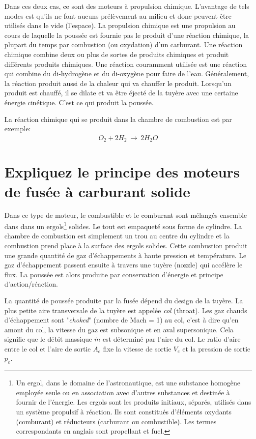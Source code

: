 \documentclass{report}
\begin{document}
Dans ces deux cas, ce sont des moteurs à propulsion chimique. L'avantage de tels modes est qu'ils ne font aucuns prélèvement au milieu et donc peuvent être utilisés dans le vide (l'espace). La propulsion chimique est une propulsion au cours de laquelle la poussée est fournie pas le produit d'une réaction chimique, la plupart du temps par combustion (ou oxydation) d'un carburant. Une réaction chimique combine deux ou plus de sortes de produits chimiques et produit différents produits chimiques. Une réaction couramment utilisée est une réaction qui combine du di-hydrogène et du di-oxygène pour faire de l'eau. Généralement, la réaction produit aussi de la chaleur qui va chauffer le produit. Lorsqu'un produit est chauffé, il se dilate et va être éjecté de la tuyère avec une certaine énergie cinétique. C'est ce qui produit la poussée.

La réaction chimique qui se produit dans la chambre de combustion est par exemple:
\begin{eqnarray}
O_2+2H_2~\rightarrow~2H_2O
\end{eqnarray}

\section{Expliquez le principe des moteurs de fusée à carburant solide}

Dans ce type de moteur, le combustible et le comburant sont mélangés ensemble dans dans un ergols\footnote{Un ergol, dans le domaine de l'astronautique, est une substance homogène employée seule ou en association avec d'autres substances et destinée à fournir de l'énergie. Les ergols sont les produits initiaux, séparés, utilisés dans un système propulsif à réaction. Ils sont constitués d'éléments oxydants (comburant) et réducteurs (carburant ou combustible). Les termes correspondants en anglais sont propellant et fuel.} solides. Le tout est empaqueté sous forme de cylindre. La chambre de combustion est simplement un trou au centre du cylindre et la combustion prend place à la surface des ergols solides. Cette combustion produit une grande quantité de gaz d'échappements à haute pression et température. Le gaz d'échappement passent ensuite à travers une tuyère (nozzle) qui accélère le flux. La poussée est alors produite par conservation d'énergie et principe d'action/réaction. 

La quantité de poussée produite par la fusée dépend du design de la tuyère. La plus petite aire transversale de la tuyère est appelée \textit{col} (throat). Les gaz chauds d'échappement sont "\textit{choked}" (nombre de Mach = 1) au col, c'est à dire qu'en amont du col, la vitesse du gaz est subsonique et en aval supersonique. Cela signifie que le débit massique $\dot{m}$ est déterminé par l'aire du col. Le ratio d'aire entre le col et l'aire de sortie $A_e$ fixe la vitesse de sortie $V_e$ et la pression de sortie $p_e$. 
\end{document}
